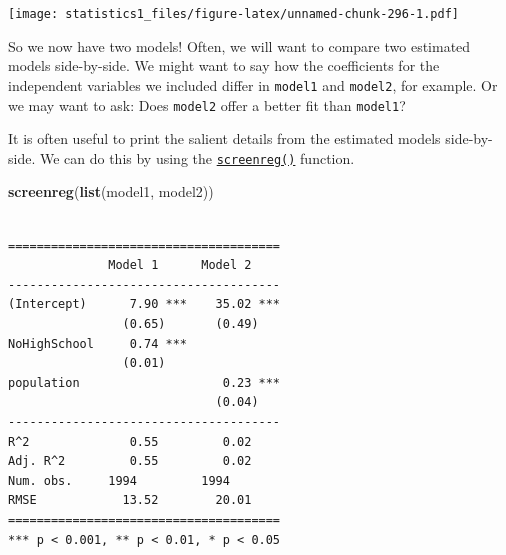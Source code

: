 \documentclass[]{article}
\newenvironment{Shaded}{\begin{snugshade}}{\end{snugshade}}
\newcommand{\KeywordTok}[1]{\textcolor[rgb]{0.13,0.29,0.53}{\textbf{#1}}}
\newcommand{\DataTypeTok}[1]{\textcolor[rgb]{0.13,0.29,0.53}{#1}}
\newcommand{\DecValTok}[1]{\textcolor[rgb]{0.00,0.00,0.81}{#1}}
\newcommand{\StringTok}[1]{\textcolor[rgb]{0.31,0.60,0.02}{#1}}
\newcommand{\OtherTok}[1]{\textcolor[rgb]{0.56,0.35,0.01}{#1}}
\newcommand{\OperatorTok}[1]{\textcolor[rgb]{0.81,0.36,0.00}{\textbf{#1}}}
\newcommand{\NormalTok}[1]{#1}
\theoremstyle{definition}
\theoremstyle{definition}
\theoremstyle{definition}
\theoremstyle{remark}
\begin{document}
\begin{Shaded}
\end{Shaded}

\texttt{[image: statistics1\_files/figure-latex/unnamed-chunk-296-1.pdf]}

So we now have two models! Often, we will want to compare two estimated
models side-by-side. We might want to say how the coefficients for the
independent variables we included differ in \texttt{model1} and
\texttt{model2}, for example. Or we may want to ask: Does
\texttt{model2} offer a better fit than \texttt{model1}?

It is often useful to print the salient details from the estimated
models side-by-side. We can do this by using the
\href{http://bit.ly/R_texreg}{\texttt{screenreg()}} function.

\begin{Shaded}
\begin{Highlighting}[]
\KeywordTok{screenreg}\NormalTok{(}\KeywordTok{list}\NormalTok{(model1, model2))}
\end{Highlighting}
\end{Shaded}

\begin{verbatim}

======================================
              Model 1      Model 2    
--------------------------------------
(Intercept)      7.90 ***    35.02 ***
                (0.65)       (0.49)   
NoHighSchool     0.74 ***             
                (0.01)                
population                    0.23 ***
                             (0.04)   
--------------------------------------
R^2              0.55         0.02    
Adj. R^2         0.55         0.02    
Num. obs.     1994         1994       
RMSE            13.52        20.01    
======================================
*** p < 0.001, ** p < 0.01, * p < 0.05
\end{verbatim}
\end{document}
